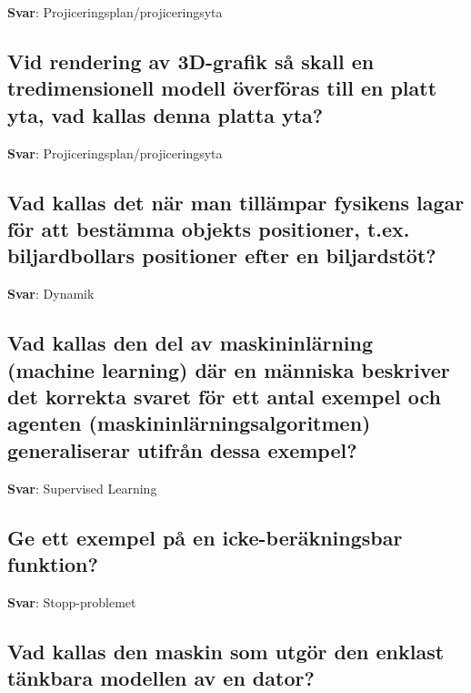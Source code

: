 \documentclass[a4paper,11pt,oneside]{article}
\begin{document}
\begin{sloppypar}
\label{q:59:sa:sv:True}

\textbf{Svar}: Projiceringsplan/projiceringsyta



\subsection{Vid rendering av 3D-grafik s\r{a} skall en tredimensionell modell \"overf\"oras till en platt yta, vad kallas denna platta yta?}

\label{q:60:sa:sv:True}

\textbf{Svar}: Projiceringsplan/projiceringsyta



\subsection{Vad kallas det n\"ar man till\"ampar fysikens lagar f\"or att best\"amma objekts positioner, t.ex. biljardbollars positioner efter en biljardst\"ot?}

\label{q:61:sa:sv:True}

\textbf{Svar}: Dynamik



\subsection{Vad kallas den del av maskininl\"arning (machine learning) d\"ar en m\"anniska beskriver det korrekta svaret f\"or ett antal exempel och agenten (maskininl\"arningsalgoritmen) generaliserar utifr\r{a}n dessa exempel?}

\label{q:62:sa:sv:True}

\textbf{Svar}: Supervised Learning



\subsection{Ge ett exempel p\r{a} en icke-ber\"akningsbar funktion?}

\label{q:63:sa:sv:True}

\textbf{Svar}: Stopp-problemet



\subsection{Vad kallas den maskin som utg\"or den enklast t\"ankbara modellen av en dator?}


\end{sloppypar}
\end{document}
